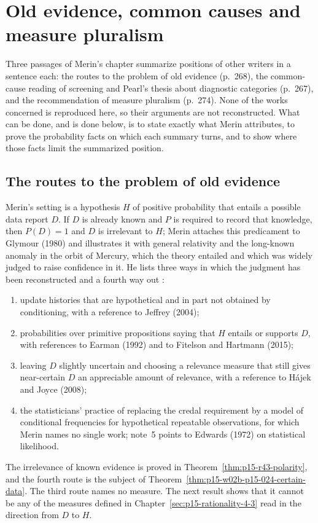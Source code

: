 \section{Old evidence, common causes and measure pluralism}
\label{sec:p15-w02b-p15-024-cited-routes}

Three passages of Merin's chapter summarize positions of other writers
in a sentence each: the routes to the problem of old evidence
(p.~268), the common-cause reading of screening and Pearl's thesis
about diagnostic categories (p.~267), and the recommendation of measure
pluralism (p.~274). None of the works concerned is reproduced here, so
their arguments are not reconstructed. What can be done, and is done
below, is to state exactly what Merin attributes, to prove the
probability facts on which each summary turns, and to show where those
facts limit the summarized position.

\subsection{The routes to the problem of old evidence}
\label{sec:p15-w02b-p15-024-old-evidence}

Merin's setting is a hypothesis \(H\) of positive probability that
entails a possible data report \(D\). If \(D\) is already known and
\(P\) is required to record that knowledge, then \(P(D)=1\) and \(D\)
is irrelevant to \(H\); Merin attaches this predicament to Glymour
(1980) and illustrates it with general relativity and the long-known
anomaly in the orbit of Mercury, which the theory entailed and which
was widely judged to raise confidence in it. He lists three ways in
which the judgment has been reconstructed and a fourth way out
\cite[p.~268]{Merin2021Relevance}:
\begin{enumerate}
\item update histories that are hypothetical and in part not obtained
  by conditioning, with a reference to Jeffrey (2004);
\item probabilities over primitive propositions saying that \(H\)
  entails or supports \(D\), with references to Earman (1992) and to
  Fitelson and Hartmann (2015);
\item leaving \(D\) slightly uncertain and choosing a relevance measure
  that still gives near-certain \(D\) an appreciable amount of
  relevance, with a reference to H\'ajek and Joyce (2008);
\item the statisticians' practice of replacing the credal requirement
  by a model of conditional frequencies for hypothetical repeatable
  observations, for which Merin names no single work; note~5 points to
  Edwards (1972) on statistical likelihood.
\end{enumerate}
The irrelevance of known evidence is proved in
Theorem~\ref{thm:p15-r43-polarity}, and the fourth route is the subject
of Theorem~\ref{thm:p15-w02b-p15-024-certain-data}. The third route
names no measure. The next result shows that it cannot be any of the
measures defined in Chapter~\ref{sec:p15-rationality-4-3} read in the
direction from \(D\) to \(H\).

